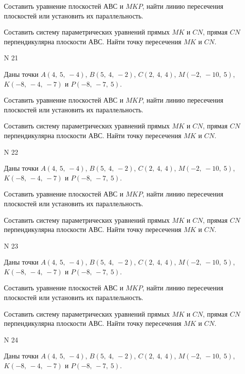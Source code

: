 \documentclass[11pt]{report}
\begin{document}
Составить уравнение плоскостей $АВС$ и $MKP$,
найти линию пересечения плоскостей или установить их параллельность.

Составить систему параметрических уравнений прямых $MK$ и $CN$,
прямая $CN$ перпендикулярна плоскости $АВС$. 
Найти точку пересечения $MK$ и $CN$.



 N 21

Даны точки $A\left( 4, \  5, \  -4\right)$, $B\left( 5, \  4, \  -2\right)$, $C\left( 2, \  4, \  4\right)$, $M\left( -2, \  -10, \  5\right)$, $K\left( -8, \  -4, \  -7\right)$ и $P\left( -8, \  -7, \  5\right)$.


Составить уравнение плоскостей $АВС$ и $MKP$,
найти линию пересечения плоскостей или установить их параллельность.

Составить систему параметрических уравнений прямых $MK$ и $CN$,
прямая $CN$ перпендикулярна плоскости $АВС$. 
Найти точку пересечения $MK$ и $CN$.



 N 22

Даны точки $A\left( 4, \  5, \  -4\right)$, $B\left( 5, \  4, \  -2\right)$, $C\left( 2, \  4, \  4\right)$, $M\left( -2, \  -10, \  5\right)$, $K\left( -8, \  -4, \  -7\right)$ и $P\left( -8, \  -7, \  5\right)$.


Составить уравнение плоскостей $АВС$ и $MKP$,
найти линию пересечения плоскостей или установить их параллельность.

Составить систему параметрических уравнений прямых $MK$ и $CN$,
прямая $CN$ перпендикулярна плоскости $АВС$. 
Найти точку пересечения $MK$ и $CN$.



 N 23

Даны точки $A\left( 4, \  5, \  -4\right)$, $B\left( 5, \  4, \  -2\right)$, $C\left( 2, \  4, \  4\right)$, $M\left( -2, \  -10, \  5\right)$, $K\left( -8, \  -4, \  -7\right)$ и $P\left( -8, \  -7, \  5\right)$.


Составить уравнение плоскостей $АВС$ и $MKP$,
найти линию пересечения плоскостей или установить их параллельность.

Составить систему параметрических уравнений прямых $MK$ и $CN$,
прямая $CN$ перпендикулярна плоскости $АВС$. 
Найти точку пересечения $MK$ и $CN$.



 N 24

Даны точки $A\left( 4, \  5, \  -4\right)$, $B\left( 5, \  4, \  -2\right)$, $C\left( 2, \  4, \  4\right)$, $M\left( -2, \  -10, \  5\right)$, $K\left( -8, \  -4, \  -7\right)$ и $P\left( -8, \  -7, \  5\right)$.
\end{document}
